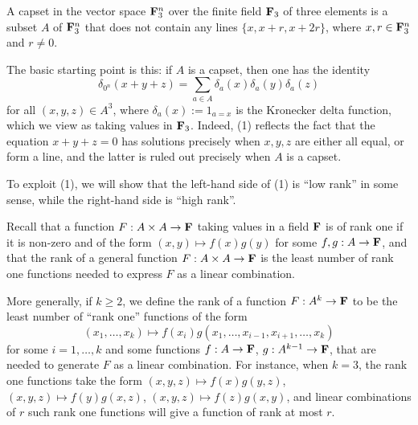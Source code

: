 
A capset in the vector space ${\bf F}_3^n$ over the finite field ${\bf F}_3$ of three elements is a subset $A$ of ${\bf F}_3^n$ that does not contain any lines $\{x,x+r,x+2r\}$, where $x,r\in{\bf F}_3^n$ and $r\ne0$.

The basic starting point is this: if $A$ is a capset, then one has the identity
\begin{equation}
\delta_{0^n}(x+y+z)=\sum_{a\in A}\delta_a(x)\delta_a(y)\delta_a(z)\tag{1}
\end{equation}
for all $(x,y,z)\in A^3$, where $\delta_a(x):=1_{a=x}$ is the Kronecker delta function, which we view as taking values in ${\bf F}_3$. Indeed, (1) reflects the fact that the equation $x+y+z=0$ has solutions precisely when $x,y,z$ are either all equal, or form a line, and the latter is ruled out precisely when $A$ is a capset.

To exploit (1), we will show that the left-hand side of (1) is ``low rank'' in some sense, while the right-hand side is ``high rank''.

Recall that a function $F:A\times A\to{\bf F}$ taking values in a field ${\bf F}$ is of rank one if it is non-zero and of the form $(x,y)\mapsto f(x)g(y)$ for some $f,g:A\to{\bf F}$, and that the rank of a general function $F:A\times A\to{\bf F}$ is the least number of rank one functions needed to express $F$ as a linear combination.

More generally, if $k\ge2$, we define the rank of a function $F:A^k\to{\bf F}$ to be the least number of ``rank one'' functions of the form
\[
(x_1,\ldots,x_k)\mapsto f(x_i)g(x_1,\ldots,x_{i-1},x_{i+1},\ldots,x_k)
\]
for some $i=1,\ldots,k$ and some functions $f:A\to{\bf F}$, $g:A^{k-1}\to{\bf F}$, that are needed to generate $F$ as a linear combination. For instance, when $k=3$, the rank one functions take the form $(x,y,z)\mapsto f(x)g(y,z)$, $(x,y,z)\mapsto f(y)g(x,z)$, $(x,y,z)\mapsto f(z)g(x,y)$, and linear combinations of $r$ such rank one functions will give a function of rank at most $r$.

